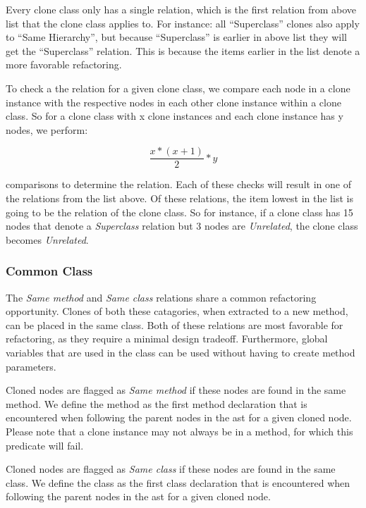 Every clone class only has a single relation, which is the first relation from above list that the clone class applies to. For instance: all ``Superclass'' clones also apply to ``Same Hierarchy'', but because ``Superclass'' is earlier in above list they will get the ``Superclass'' relation. This is because the items earlier in the list denote a more favorable refactoring.

To check a the relation for a given clone class, we compare each node in a clone instance with the respective nodes in each other clone instance within a clone class. So for a clone class with x clone instances and each clone instance has y nodes, we perform:

\begin{equation}\label{eq:sameclass}
\frac{x * (x + 1)}{2} * y
\end{equation}

comparisons to determine the relation. Each of these checks will result in one of the relations from the list above. Of these relations, the item lowest in the list is going to be the relation of the clone class. So for instance, if a clone class has 15 nodes that denote a \textit{Superclass} relation but 3 nodes are \textit{Unrelated}, the clone class becomes \textit{Unrelated}.

\subsubsection{Common Class}
The \textit{Same method} and \textit{Same class} relations share a common refactoring opportunity. Clones of both these catagories, when extracted to a new method, can be placed in the same class. Both of these relations are most favorable for refactoring, as they require a minimal design tradeoff. Furthermore, global variables that are used in the class can be used without having to create method parameters.

Cloned nodes are flagged as \textit{Same method} if these nodes are found in the same method. We define the method as the first method declaration that is encountered when following the parent nodes in the ast for a given cloned node. Please note that a clone instance may not always be in a method, for which this predicate will fail.

Cloned nodes are flagged as \textit{Same class} if these nodes are found in the same class. We define the class as the first class declaration that is encountered when following the parent nodes in the ast for a given cloned node.

